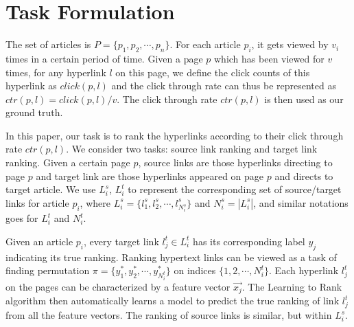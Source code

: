 \section {Task Formulation}

The set of articles is $P = \{p_1, p_2, \cdots, p_n\}$. For each article $p_i$, it gets viewed by $v_i$ times in a certain period of time. Given a page $p$ which has been viewed for $v$ times, for any hyperlink $l$ on this page, we define the click counts of this hyperlink as $click(p, l)$ and the click through rate can thus be represented as $ctr(p,l) = click(p,l) / v$. The click through rate $ctr(p, l)$ is then used as our ground truth.

In this paper, our task is to rank the hyperlinks according to their click through rate $ctr(p,l)$. We consider two tasks: source link ranking and target link ranking. Given a certain page $p$, source links are those hyperlinks directing to page $p$ and target link are those hyperlinks appeared on page $p$ and directs to target article. We use $L^s_i$, $L^t_i$ to represent the corresponding set of source/target links for article $p_i$, where $L^s_i = \{l^s_1, l^s_2, \cdots, l^s_{N^s_i}\}$ and $N^s_i = |L^s_i|$, and similar notations goes for $L^t_i$ and $N^t_i$. 

Given an article $p_i$, every target link $l^t_j \in L^t_i$ has its corresponding label $y_j$ indicating its true ranking. Ranking hypertext links can be viewed as a task of finding permutation $\pi = \{y^*_1, y^*_2, \cdots, y^*_{N^t_i}\}$ on indices $\{1,2,\cdots,N^t_i\}$. Each hyperlink $l^t_j$ on the pages can be characterized by a feature vector $\vec{x_j}$. The Learning to Rank algorithm then automatically learns a model to predict the true ranking of link $l^t_j$ from all the feature vectors. The ranking of source links is similar, but within $L^s_i$.